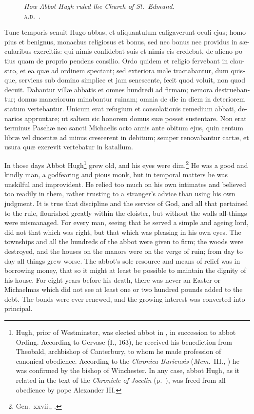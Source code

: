 \documentclass{book}
\newcommand{\blockhead}[4][]{
\begin{figure}
\centering
\vspace{#4}
\parbox{2.75cm}{\begin{center}\footnotesize \color{BrickRed} \emph{#2}\\ #1 \end{center}}
\end{figure}
}
\begin{document}
\begin{paracol}{2}

\begin{otherlanguage}{latin}
\blockhead[\textsc{a.d}.\ .]{How Abbot Hugh ruled the Church of St.\ Edmund.}{4}{-0.45cm}
Tunc temporis senuit Hugo abbas, et aliquantulum caligaverunt oculi ejus; homo pius et benignus, monachus religiosus et bonus, sed nec bonus nec providus in s\ae{}cularibus exercitiis: qui nimis confidebat suis et nimis eis credebat, de alieno potius quam de proprio pendens consilio. Ordo quidem et religio fervebant in claustro, et ea qu\ae{} ad ordinem spectant; sed exteriora male tractabantur, dum quisque, serviens sub domino simplice et jam senescente, fecit quod voluit, non quod decuit. Dabantur vill\ae{} abbatis et omnes hundredi ad firmam; nemora destruebantur; domus maneriorum minabantur ruinam; omnia de die in diem in deteriorem statum vertebantur. Unicum erat refugium et consolationis remedium abbati, denarios appruntare; ut saltem sic honorem domus su\ae{} posset sustentare. Non erat terminus Pasch\ae{} nec sancti Michaelis octo annis ante obitum ejus, quin centum libr\ae{} vel ducent\ae{} ad minus crescerent in debitum; semper renovabantur cart\ae{}, et usura qu\ae{} excrevit vertebatur in katallum.

\end{otherlanguage}

\switchcolumn

In those days Abbot Hugh\footnote{Hugh, prior of Westminster, was elected abbot in , in succession to abbot Ording. According to Gervase (I., 163), he received his benediction from Theobald, archbishop of Canterbury, to whom he made profession of canonical obedience. According to the \emph{Chronica Buriensis} (\emph{Mem}.\ III., ) he was confirmed by the bishop of Winchester. In any case, abbot Hugh, as it related in the text of the \emph{Chronicle of Jocelin} (p.\ ), was freed from all obedience by pope Alexander III.} grew old, and his eyes were dim.\footnote{Gen.\ xxvii., .} He was a good and kindly man, a godfearing and pious monk, but in temporal matters he was unskilful and improvident. He relied too much on his own intimates and believed too readily in them, rather trusting to a stranger's advice than using his own judgment. It is true that discipline and the service of God, and all that pertained to the rule, flourished greatly within the cloister, but without the walls all-things were mismanaged. For every man, seeing that he served a simple and ageing lord, did not that which was right, but that which was pleasing in his own eyes. The townships and all the hundreds of the abbot were given to firm; the woods were destroyed, and the houses on the manors were on the verge of ruin; from day to day all things grew worse. The abbot's sole resource and means of relief was in borrowing money, that so it might at least be possible to maintain the dignity of his house. For eight years before his death, there was never an Easter or Michaelmas which did not see at least one or two hundred pounds added to the debt. The bonds were ever renewed, and the growing interest was converted into principal.


\end{paracol}
\end{document}
